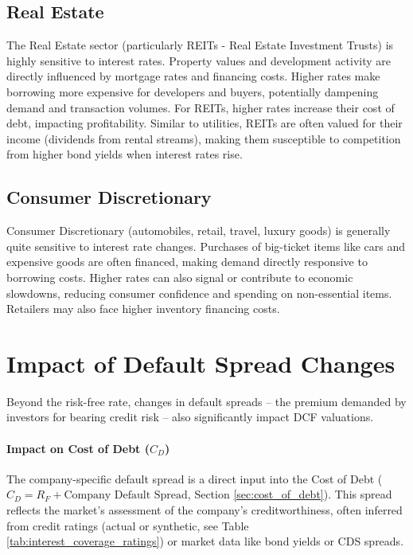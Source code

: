\subsection{Real Estate} \label{subsec:industry_real_estate}
The Real Estate sector (particularly REITs - Real Estate Investment Trusts) is highly sensitive to interest rates. Property values and development activity are directly influenced by mortgage rates and financing costs. Higher rates make borrowing more expensive for developers and buyers, potentially dampening demand and transaction volumes. For REITs, higher rates increase their cost of debt, impacting profitability. Similar to utilities, REITs are often valued for their income (dividends from rental streams), making them susceptible to competition from higher bond yields when interest rates rise.

\subsection{Consumer Discretionary} \label{subsec:industry_consumer_discretionary}
Consumer Discretionary (automobiles, retail, travel, luxury goods) is generally quite sensitive to interest rate changes. Purchases of big-ticket items like cars and expensive goods are often financed, making demand directly responsive to borrowing costs. Higher rates can also signal or contribute to economic slowdowns, reducing consumer confidence and spending on non-essential items. Retailers may also face higher inventory financing costs.

\section{Impact of Default Spread Changes}

Beyond the risk-free rate, changes in default spreads – the premium demanded by investors for bearing credit risk – also significantly impact DCF valuations.

\paragraph{Impact on Cost of Debt (\(C_D\))}
The company-specific default spread is a direct input into the Cost of Debt (\(C_D = R_F + \text{Company Default Spread}\), Section \ref{sec:cost_of_debt}). This spread reflects the market's assessment of the company's creditworthiness, often inferred from credit ratings (actual or synthetic, see Table \ref{tab:interest_coverage_ratings}) or market data like bond yields or CDS spreads. 

